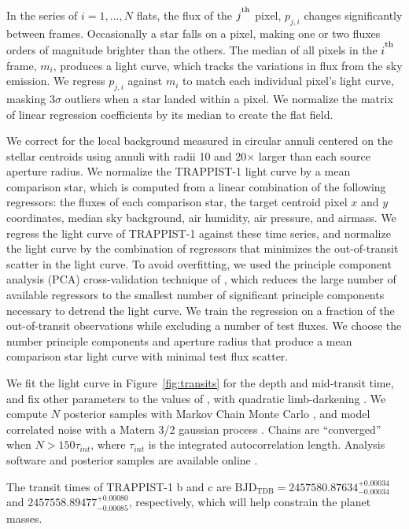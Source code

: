 In the series of $i=1,...,N$ flats, the flux of the $j^\textsuperscript{th}$ pixel, $p_{j,i}$ changes significantly between frames. Occasionally a star falls on a pixel, making one or two fluxes orders of magnitude brighter than the others. The median of all pixels in the $i^\textsuperscript{th}$ frame, $m_i$, produces a light curve, which tracks the variations in flux from the sky emission. We regress $p_{j,i}$ against $m_i$  to match each individual pixel's light curve, masking $3\sigma$ outliers when a star landed within a pixel. We normalize the matrix of linear regression coefficients by its median to create the flat field. 

We correct for the local background measured in circular annuli centered on the stellar centroids using annuli with radii 10 and 20$\times$ larger than each source aperture radius. We normalize the TRAPPIST-1 light curve by a mean comparison star, which is computed from a linear combination of the following regressors: the fluxes of each comparison star, the target centroid pixel $x$ and $y$ coordinates, median sky background, air humidity, air pressure, and airmass. We regress the light curve of TRAPPIST-1 against these time series, and normalize the light curve by the combination of regressors that minimizes the out-of-transit scatter in the light curve. To avoid overfitting, we used the principle component analysis (PCA) cross-validation technique of \citet{luger2016}, which reduces the large number of available regressors to the smallest number of significant principle components necessary to detrend the light curve. We train the regression on a fraction of the out-of-transit observations while excluding a number of test fluxes. We choose the number principle components and aperture radius that produce a mean comparison star light curve with minimal test flux scatter. 

We fit the light curve in Figure~\ref{fig:transits} for the depth and mid-transit time, and fix other parameters to the values of \citet{Gillon2016}, with quadratic limb-darkening \citep{Mandel2002}. We compute $N$ posterior samples with Markov Chain Monte Carlo \citep{Foreman-Mackey2013}, and model correlated noise with a Matern 3/2 gaussian process \citep{Ambikasaran2014}. Chains are ``converged'' when $N > 150 \tau_{int}$, where $\tau_{int}$ is the integrated autocorrelation length. Analysis software and posterior samples are available online \citep{software}.

The transit times of TRAPPIST-1 b and c are $\mathrm{BJD}_{\mathrm{TDB}} = 2457580.87634^{+0.00034}_{-0.00034}$ and $2457558.89477^{+0.00080}_{-0.00085}$, respectively, which will help constrain the planet masses.

